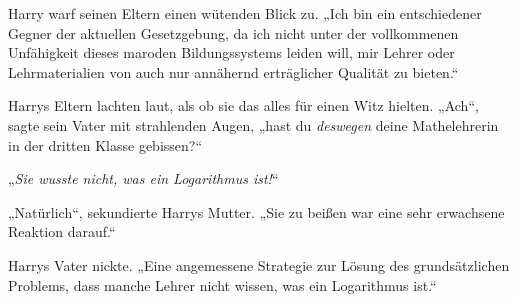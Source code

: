 Harry warf seinen Eltern einen wütenden Blick zu. „Ich bin ein entschiedener Gegner der aktuellen Gesetzgebung, da ich nicht unter der vollkommenen Unfähigkeit dieses maroden Bildungssystems leiden will, mir Lehrer oder Lehrmaterialien von auch nur annähernd erträglicher Qualität zu bieten.“

Harrys Eltern lachten laut, als ob sie das alles für einen Witz hielten. „Ach“, sagte sein Vater mit strahlenden Augen, „hast du \emph{deswegen} deine Mathelehrerin in der dritten Klasse gebissen?“

„\emph{Sie wusste nicht, was ein Logarithmus ist!}“%

„Natürlich“, sekundierte Harrys Mutter. „Sie zu beißen war eine sehr erwachsene Reaktion darauf.“

Harrys Vater nickte. „Eine angemessene Strategie zur Lösung des grundsätzlichen Problems, dass manche Lehrer nicht wissen, was ein Logarithmus ist.“

